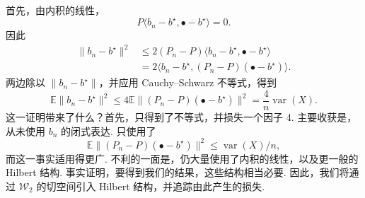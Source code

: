 首先，由内积的线性，
$$P\langle b_n-b^\star,\bullet-b^\star\rangle=0.$$
因此
$$\begin{aligned}
\|b_n-b^\star\|^2&\le2(P_n-P)\langle b_n-b^\star,\bullet-b^\star\rangle\\
&=2\langle b_n-b^\star,(P_n-P)(\bullet-b^\star)\rangle.
\end{aligned}$$
两边除以 $\|b_n-b^\star\|$，并应用 Cauchy--Schwarz 不等式，得到
\begin{equation}\label{eq:8.1}
\mathbb E\|b_n-b^\star\|^2\le4\mathbb E\|(P_n-P)(\bullet-b^\star)\|^2
=\frac4n\operatorname{var}(X).
\end{equation}
这一证明带来了什么？首先，只得到了不等式，并损失一个因子 4. 主要收获是，从未使用 $b_n$ 的闭式表达. 只使用了
$$\mathbb E\|(P_n-P)(\bullet-b^\star)\|^2\le\operatorname{var}(X)/n,$$
而这一事实适用得更广. 不利的一面是，仍大量使用了内积的线性，以及更一般的 Hilbert 结构. 事实证明，要得到我们的结果，这些结构相当必要. 因此，我们将通过 $\mathcal W_2$ 的切空间引入 Hilbert 结构，并追踪由此产生的损失.
